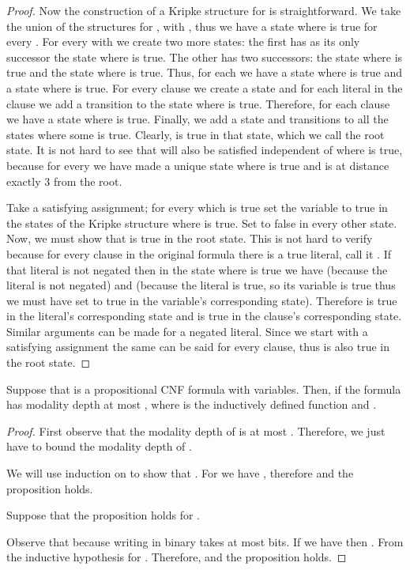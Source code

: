 \documentclass{llncs}
\begin{document}
\begin{proof}
Now the construction of a Kripke structure for  is straightforward. We
take the union of the structures for , with , thus we have a
state where  is true for every .  For every  with  we
create two more states: the first has as its only successor the state where
 is true.  The other has two successors: the state where  is true and
the state where  is true. Thus, for each  we have a state where
 is true and a state where  is true. For every clause
we create a state and for each literal  in the clause we add a transition
to the state where  is true. Therefore, for each clause  we have
a state where  is true. Finally, we add a state and transitions to
all the states where some  is true. Clearly,  is true in
that state, which we call the root state. It is not hard to see that 
will also be satisfied independent of where  is true, because for every 
we have made a unique state  where  is true and  is at distance
exactly 3 from the root.

Take a satisfying assignment; for every  which is true set the variable
 to true in the states of the Kripke structure where  is true. Set 
to false in every other state. Now, we must show that  is true in the
root state. This is not hard to verify because for every clause in the original
formula there is a true literal, call it . If that literal is not negated
then in the state where  is true we have  (because
the literal is not negated) and  (because the literal is true, so its
variable is true thus we must have set  to true in the variable's
corresponding state). Therefore  is true in the literal's corresponding state and
 is true in the clause's corresponding state. Similar arguments
can be made for a negated literal. Since we start with a satisfying assignment
the same can be said for every clause, thus  is also true in the root
state. 

\end{proof}



\begin{lemma} \label{lem:smdepth}

Suppose that  is a propositional CNF formula with  variables. Then,
if  the formula 
has modality depth at most , where  is the inductively defined
function  and .

\end{lemma}

\begin{proof}

First observe that the modality depth of  is at most . Therefore, we just have to bound the modality depth of .

We will use induction on  to show that .  For  we have , therefore 
and the proposition holds.

Suppose that the proposition holds for .

Observe that  because writing  in binary takes at
most  bits. If we have  then .
From the inductive hypothesis  for .  Therefore,
 and the proposition holds. 

\end{proof}
\end{document}

